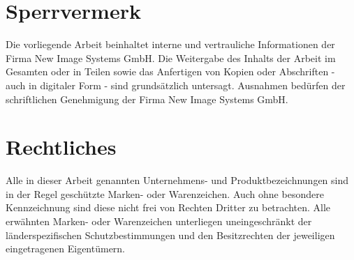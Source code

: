 \section*{Sperrvermerk}
Die vorliegende Arbeit beinhaltet interne und vertrauliche Informationen der Firma New Image Systems GmbH. Die Weitergabe des Inhalts der Arbeit im Gesamten oder in Teilen sowie das Anfertigen von Kopien oder Abschriften - auch in digitaler Form - sind grundsätzlich untersagt. Ausnahmen bedürfen der schriftlichen Genehmigung der Firma New Image Systems GmbH.
\null
\vfill
\section*{Rechtliches}
Alle in dieser Arbeit genannten Unternehmens- und Produktbezeichnungen sind in der Regel geschützte Marken- oder Warenzeichen. Auch ohne besondere Kennzeichnung sind diese nicht frei von Rechten Dritter zu betrachten. Alle erwähnten Marken- oder Warenzeichen unterliegen uneingeschränkt der länderspezifischen Schutzbestimmungen und den Besitzrechten der jeweiligen eingetragenen Eigentümern.